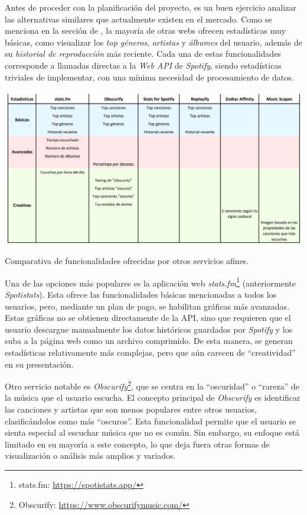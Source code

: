 Antes de proceder con la planificación del proyecto, es un buen ejercicio analizar las alternativas similares que actualmente existen en el mercado. Como se menciona en la sección de , la mayoría de otras webs ofrecen estadísticas muy básicas, como visualizar los \textit{top géneros}, \textit{artistas} y \textit{álbumes} del usuario, además de su \textit{historial de reproducción} más reciente. Cada una de estas funcionalidades corresponde a llamadas directas a la \textit{Web API} de \textit{Spotify}, siendo estadísticas triviales de implementar, con una mínima necesidad de procesamiento de datos.

\vspace{0.5cm}

\begin{table}[htbp]
    \centering
    \includegraphics[width=\textwidth]{figures/tabla_comparativa.png}
    \caption{Comparativa de funcionalidades ofrecidas por otros servicios afines.}
    \label{tab:comparativa}
\end{table}

\vspace{0.5cm}

Una de las opciones más populares es la aplicación web \textit{stats.fm}\footnote{stats.fm: \url{https://spotistats.app/}} (anteriormente \textit{Spotistats}). Esta ofrece las funcionalidades básicas mencionadas a todos los usuarios, pero, mediante un plan de pago, se habilitan gráficas más avanzadas. Estas gráficas no se obtienen directamente de la API, sino que requieren que el usuario descargue manualmente los datos históricos guardados por \textit{Spotify} y los suba a la página web como un archivo comprimido. De esta manera, se generan estadísticas relativamente más complejas, pero que aún carecen de ``creatividad'' en su presentación.

Otro servicio notable es \textit{Obscurify}\footnote{Obscurify: \url{https://www.obscurifymusic.com/}}, que se centra en la ``oscuridad'' o ``rareza'' de la música que el usuario escucha. El concepto principal de \textit{Obscurify} es identificar las canciones y artistas que son menos populares entre otros usuarios, clasificándolos como más ``oscuros''. Esta funcionalidad permite que el usuario se sienta especial al escuchar música que no es común. Sin embargo, su enfoque está limitado en su mayoría a este concepto, lo que deja fuera otras formas de visualización o análisis más amplios y variados.


